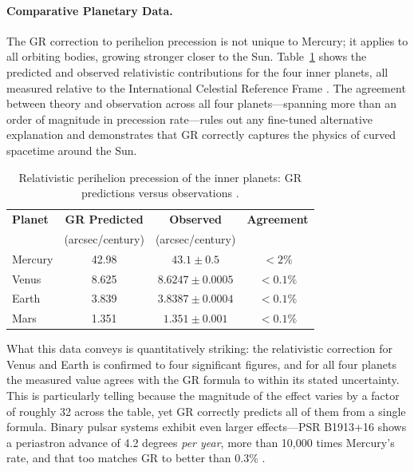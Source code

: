 \documentclass[12pt, a4paper]{article}
\begin{document}
	\paragraph{Comparative Planetary Data.}
	The GR correction to perihelion precession is not unique to Mercury; it applies to all orbiting bodies, growing stronger closer to the Sun. Table~\ref{tab:perihelion} shows the predicted and observed relativistic contributions for the four inner planets, all measured relative to the International Celestial Reference Frame \citep{willConfrontationGeneralRelativity2014}. The agreement between theory and observation across all four planets—spanning more than an order of magnitude in precession rate—rules out any fine-tuned alternative explanation and demonstrates that GR correctly captures the physics of curved spacetime around the Sun.
	
	\begin{table}[h]
		\centering
		\caption{Relativistic perihelion precession of the inner planets: GR predictions versus observations \citep{willConfrontationGeneralRelativity2014}.}
		\label{tab:perihelion}
		\begin{tabular}{lccc}
			\hline
			\textbf{Planet} & \textbf{GR Predicted} & \textbf{Observed} & \textbf{Agreement} \\
			& (arcsec/century) & (arcsec/century) & \\
			\hline
			Mercury & 42.98 & $43.1 \pm 0.5$ & $<2\%$ \\
			Venus   & 8.625 & $8.6247 \pm 0.0005$ & $<0.1\%$ \\
			Earth   & 3.839 & $3.8387 \pm 0.0004$ & $<0.1\%$ \\
			Mars    & 1.351 & $1.351 \pm 0.001$   & $<0.1\%$ \\
			\hline
		\end{tabular}
	\end{table}
	
	What this data conveys is quantitatively striking: the relativistic correction for Venus and Earth is confirmed to four significant figures, and for all four planets the measured value agrees with the GR formula to within its stated uncertainty. This is particularly telling because the magnitude of the effect varies by a factor of roughly 32 across the table, yet GR correctly predicts all of them from a single formula. Binary pulsar systems exhibit even larger effects—PSR B1913+16 shows a periastron advance of 4.2 degrees \textit{per year}, more than 10,000 times Mercury's rate, and that too matches GR to better than 0.3\% \citep{willConfrontationGeneralRelativity2014}.
	
\end{document}
